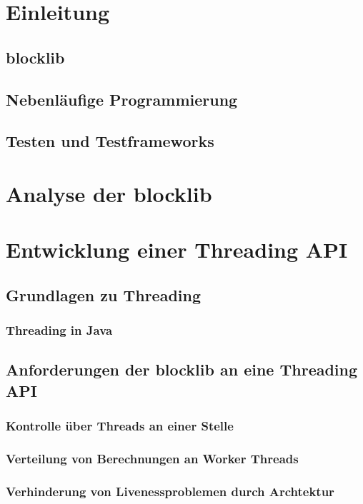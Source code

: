 \documentclass[12pt,a4paper,listof=totocnumbered,parskip=half]{scrreprt}
\begin{document}

\null\thispagestyle{empty}\clearpage
\tableofcontents
\chapter{Einleitung}
\section{blocklib}
\section{Nebenläufige Programmierung}
\section{Testen und Testframeworks}

\chapter{Analyse der blocklib}


\chapter{Entwicklung einer Threading API}

\section{Grundlagen zu Threading}


\subsection{Threading in Java}
\section{Anforderungen der blocklib an eine Threading API}
\subsection{Kontrolle über Threads an einer Stelle}
\subsection{Verteilung von Berechnungen an Worker Threads}
\subsection{Verhinderung von Livenessproblemen durch Archtektur}
\end{document}

